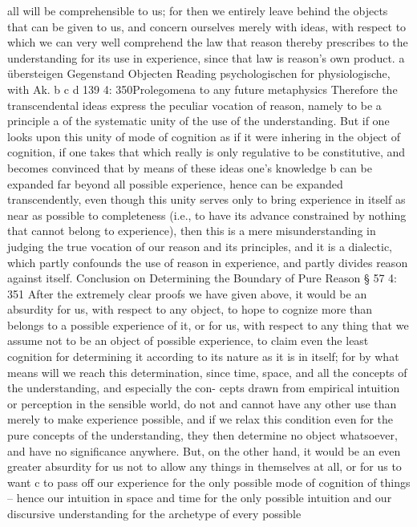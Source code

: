 all will be comprehensible to us; for then we entirely leave behind the objects
that can be given to us, and concern ourselves merely with ideas, with respect
to which we can very well comprehend the law that reason thereby prescribes
to the understanding for its use in experience, since that law is reason’s own
product.
a übersteigen
Gegenstand
Objecten
Reading psychologischen for physiologische, with Ak.
b
c
d
139
4: 350Prolegomena to any future metaphysics
Therefore the transcendental ideas express the peculiar vocation of
reason, namely to be a principle a of the systematic unity of the use of
the understanding. But if one looks upon this unity of mode of cognition
as if it were inhering in the object of cognition, if one takes that which
really is only regulative to be constitutive, and becomes convinced that by
means of these ideas one’s knowledge b can be expanded far beyond all
possible experience, hence can be expanded transcendently, even though
this unity serves only to bring experience in itself as near as possible to
completeness (i.e., to have its advance constrained by nothing that cannot
belong to experience), then this is a mere misunderstanding in judging
the true vocation of our reason and its principles, and it is a dialectic,
which partly confounds the use of reason in experience, and partly divides
reason against itself.
Conclusion
on
Determining the Boundary of Pure Reason
§ 57
4: 351
After the extremely clear proofs we have given above, it would be an
absurdity for us, with respect to any object, to hope to cognize more
than belongs to a possible experience of it, or for us, with respect to any
thing that we assume not to be an object of possible experience, to claim
even the least cognition for determining it according to its nature as it is
in itself; for by what means will we reach this determination, since time,
space, and all the concepts of the understanding, and especially the con-
cepts drawn from empirical intuition or perception in the sensible world,
do not and cannot have any other use than merely to make experience
possible, and if we relax this condition even for the pure concepts of the
understanding, they then determine no object whatsoever, and have no
signiﬁcance anywhere.
But, on the other hand, it would be an even greater absurdity for us
not to allow any things in themselves at all, or for us to want c to pass
off our experience for the only possible mode of cognition of things –
hence our intuition in space and time for the only possible intuition
and our discursive understanding for the archetype of every possible
